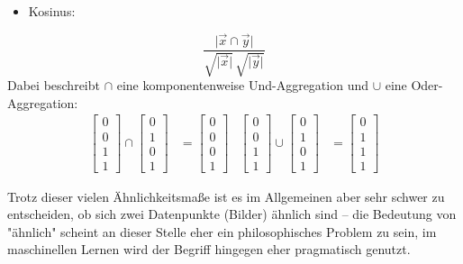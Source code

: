 		\begin{itemize}
			\item Kosinus:
		\end{itemize}
		\begin{equation}
			\frac{\lvert \vec{x} \cap \vec{y} \rvert}{\sqrt{\lvert \vec{x} \rvert} \, \sqrt{\lvert \vec{y} \rvert}}
		\end{equation}
		Dabei beschreibt \( \cap \) eine komponentenweise Und-Aggregation und \( \cup \) eine Oder-Aggregation:
		\begin{align}
			\begin{bmatrix}
				0 \\ 0 \\ 1 \\ 1
			\end{bmatrix}
			\cap
			\begin{bmatrix}
				0 \\ 1 \\ 0 \\ 1
			\end{bmatrix}
			&=
			\begin{bmatrix}
				0 \\ 0 \\ 0 \\ 1
			\end{bmatrix}
			&
			\begin{bmatrix}
				0 \\ 0 \\ 1 \\ 1
			\end{bmatrix}
			\cup
			\begin{bmatrix}
				0 \\ 1 \\ 0 \\ 1
			\end{bmatrix}
			&=
			\begin{bmatrix}
				0 \\ 1 \\ 1 \\ 1
			\end{bmatrix}
		\end{align}

		Trotz dieser vielen Ähnlichkeitsmaße ist es im Allgemeinen aber sehr schwer zu entscheiden, ob sich zwei Datenpunkte (\zB Bilder) ähnlich sind -- die Bedeutung von "ähnlich" scheint an dieser Stelle eher ein philosophisches Problem zu sein, im maschinellen Lernen wird der Begriff hingegen eher pragmatisch genutzt.

